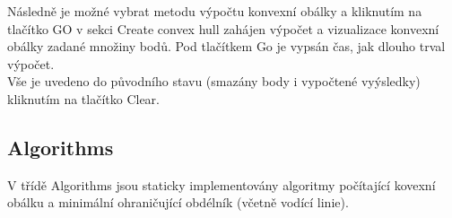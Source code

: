 \documentclass[a4paper, 12pt]{article}
\begin{document}
Následně je možné vybrat metodu výpočtu konvexní obálky a kliknutím na tlačítko GO v 
sekci Create convex hull zahájen výpočet a vizualizace konvexní obálky zadané množiny bodů.
Pod tlačítkem Go je vypsán čas, jak dlouho trval výpočet.\\


Vše je uvedeno do původního stavu (smazány body i vypočtené vyýsledky) kliknutím na tlačítko Clear.\\

\clearpage




\subsection{Algorithms}
V třídě Algorithms jsou staticky implementovány algoritmy počítající kovexní obálku a minimální ohraničující obdélník (včetně vodící linie).
\end{document}
